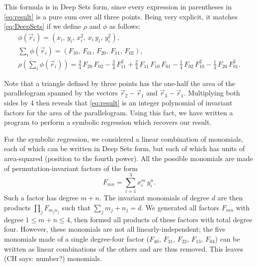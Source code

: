 \documentclass[12pt]{article}
\newcommand{\CH}[1]{{\color{blue} (CH says: #1)}}
\newcommand{\pseudosection}[1]
{\noindent{\color{green!66!black} (\textit{#1})}\par}
\begin{document}
This formula is in Deep Sets form, since
every expression in parentheses in \eqref{eq:result} is a pure sum over all three points.
Being very explicit, it matches \eqref{eq:DeepSets} if we define $\rho$ and $\phi$ as follows:
\begin{gather}
    \phi(\vec{r}_i) = (
        x_i, \,
        y_i, \,
        x_i^2, \,
        x_i \, y_i, \,
        y_i^2
    ), \\
    {\textstyle \sum_i} \phi(\vec{r}_i) = (
        F_{10}, \,
        F_{01}, \,
        F_{20}, \,
        F_{11}, \,
        F_{02}
    ), \\
    \rho \left( {\textstyle \sum_i} \phi(\vec{r}_i) \right)
    = \tfrac{3}{4} \, F_{20} \, F_{02}
    - \tfrac{3}{4} \, F_{11}^2
    + \tfrac{2}{4} \, F_{11} \, F_{10} \, F_{01}
    - \tfrac{1}{4} \, F_{02} \, F_{10}^2
    - \tfrac{1}{4} \, F_{20} \, F_{01}^2.
\end{gather}

\pseudosection{A note on symbolic regression}

Note that a triangle defined by three points has the one-half the area of the parallelogram spanned by the vectors $\vec{r}_2 - \vec{r}_1$ and $\vec{r}_3 - \vec{r}_1$. Multiplying both sides by 4 then reveals that \eqref{eq:result} is an integer polynomial of invariant factors for the area of the parallelogram. Using this fact, we have written a program to perform a symbolic regression which recovers our result. 

For the symbolic regression, we considered a linear combination of monomials, each of which can be written in Deep Sets form, but each of which has units of area-squared (position to the fourth power).
All the possible monomials are made of permutation-invariant factors of the form 
\begin{equation}
F_{mn} = \sum_{i=1}^{3} x_i^m \, y_i^n.
\end{equation}
Such a factor has degree $m + n$.
The invariant monomials of degree $d$ are then products $\prod_j F_{m_j n_j}$ such that $\sum_j m_j + n_j = d$.
We generated all factors $F_{mn}$ with degree $1 \leq m + n \leq 4$, then formed all products of these factors with total degree four.
However, these monomials are not all linearly-independent;
the five monomials made of a single degree-four factor ($F_{40}$, $F_{31}$, $F_{22}$, $F_{13}$, $F_{04}$) can be written as linear combinations of the others and are thus removed.
This leaves \CH{number?} monomials.
\end{document}
